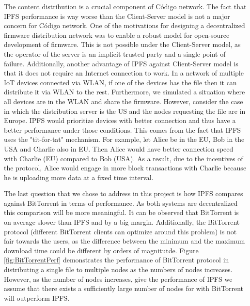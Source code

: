 {{{The content distribution is a crucial component of Código network. The fact that IPFS performance is way worse than the Client-Server model is not a major concern for Código network. One of the motivations for designing a decentralized firmware distribution network was to enable a robust model for open-source development of firmware. This is not possible under the Client-Server model, as the operator of the server is an implicit trusted party and a single point of failure. Additionally, another advantage of IPFS against Client-Server model is that it does not require an Internet connection to work. In a network of multiple IoT devices connected via WLAN, if one of the devices has the file then it can distribute it via WLAN to the rest. Furthermore, we simulated a situation where all devices are in the WLAN and share the firmware. However, consider the case in which the distribution server is the US and the nodes requesting the file are in Europe. IPFS would prioritize devices with better connection and thus have a better performance under those conditions. This comes from the fact that IPFS uses the "tit-for-tat" mechanism. For example, let Alice be in the EU, Bob in the USA and Charlie also in EU. Then Alice would have better connection speed with Charlie (EU) compared to Bob (USA). As a result, due to the incentives of the protocol, Alice would engage in more block transactions with Charlie because he is uploading more data at a fixed time interval.

The last question that we chose to address in this project is how IPFS compares against BitTorrent in terms of performance. As both systems are decentralized this comparison will be more meaningful. It can be observed that BitTorrent is on average slower than IPFS and by a big margin. Additionally, the BitTorrent protocol (different BitTorrent clients can optimize around this problem) is not fair towards the users, as the difference between the minimum and the maximum download time could be different by orders of magnitutde. Figure \ref{fig:BitTorrentPerf} demonstrates the performance of BitTorrent protocol in distributing a single file to multiple nodes as the numbers of nodes increases. However, as the number of nodes increases, give the performance of IPFS we assume that there exists a sufficiently large number of nodes for with BitTorrent will outperform IPFS.

}}}
